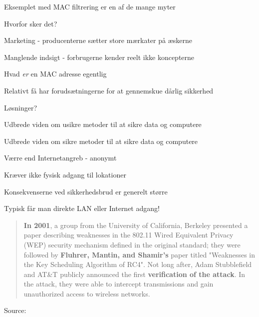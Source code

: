\documentclass[20pt,landscape,a4paper,footrule]{foils}
\begin{document}
\begin{list1}
\item Eksemplet med MAC filtrering er en af de mange myter
\item Hvorfor sker det?
\begin{list2}
\item Marketing - producenterne sætter store mærkater på æskerne
\item Manglende indsigt - forbrugerne kender reelt ikke koncepterne
\item Hvad \emph{er} en MAC adresse egentlig
\item Relativt få har forudsætningerne for at gennemskue dårlig sikkerhed
\end{list2}
\item Løsninger?
\pause
\begin{list2}
\item Udbrede viden om usikre metoder til at sikre data og computere
\item Udbrede viden om sikre metoder til at sikre data og computere
\end{list2}
\end{list1}







\begin{list2}
\item Værre end Internetangreb - anonymt
\item Kræver ikke fysisk adgang til lokationer
\item Konsekvenserne ved sikkerhedsbrud er generelt større
\item Typisk får man direkte LAN eller Internet adgang!
\end{list2}



\begin{quote}
{\bf In 2001}, a group from the University of California, Berkeley presented a paper describing weaknesses in the 802.11 Wired Equivalent Privacy (WEP) security mechanism defined in the original standard; they were followed by {\bf Fluhrer, Mantin, and Shamir's} paper titled "Weaknesses in the Key Scheduling Algorithm of RC4". Not long after, Adam Stubblefield and AT\&T publicly announced the first {\bf verification of the attack}. In the attack, they were able to intercept transmissions and gain unauthorized access to wireless networks.
\end{quote}
Source: 
\end{document}
